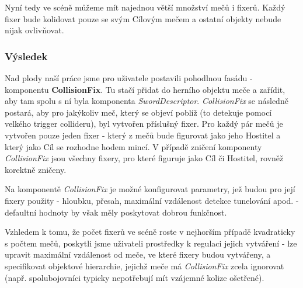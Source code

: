 Nyní tedy ve scéně můžeme mít najednou větší množství mečů i fixerů. Každý fixer bude kolidovat pouze se svým Cílovým mečem a ostatní objekty nebude nijak ovlivňovat.


\subsubsection*{Výsledek}

Nad plody naší práce jsme pro uživatele postavili pohodlnou fasádu - komponentu \textbf{CollisionFix}. Tu stačí přidat do herního objektu meče a zařídit, aby tam spolu s ní byla komponenta \textit{SwordDescriptor}. \textit{CollisionFix} se následně postará, aby pro jakýkoliv meč, který se objeví poblíž (to detekuje pomocí velkého trigger collideru), byl vytvořen příslušný fixer. Pro každý pár mečů je vytvořen pouze jeden fixer - který z mečů bude figurovat jako jeho Hostitel a který jako Cíl se rozhodne hodem mincí. V případě zničení komponenty \textit{CollisionFix} jsou všechny fixery, pro které figuruje jako Cíl či Hostitel, rovněž korektně zničeny.

Na komponentě \textit{CollisionFix} je možné konfigurovat parametry, jež budou pro její fixery použity - hloubku, přesah, maximální vzdálenost detekce tunelování apod. - defaultní hodnoty by však měly poskytovat dobrou funkčnost. 

Vzhledem k tomu, že počet fixerů ve scéně roste v nejhorším případě kvadraticky s počtem mečů, poskytli jsme uživateli prostředky k regulaci jejich vytváření - lze upravit maximální vzdálenost od meče, ve které fixery budou vytvářeny, a specifikovat objektové hierarchie, jejichž meče má \textit{CollisionFix} zcela ignorovat (např. spolubojovníci typicky nepotřebují mít vzájemné kolize ošetřené).




